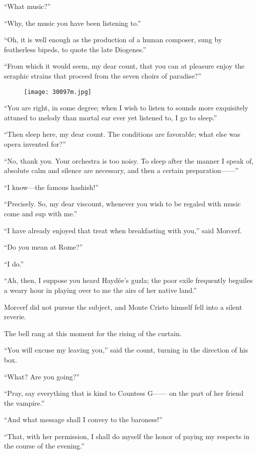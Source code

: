 “What music?”

“Why, the music you have been listening to.”

“Oh, it is well enough as the production of a human composer, sung by
featherless bipeds, to quote the late Diogenes.”

“From which it would seem, my dear count, that you can at pleasure
enjoy the seraphic strains that proceed from the seven choirs of
paradise?”

\begin{figure}[ht]
\texttt{[image: 30097m.jpg]}
\end{figure}

“You are right, in some degree; when I wish to listen to sounds more
exquisitely attuned to melody than mortal ear ever yet listened to, I
go to sleep.”

“Then sleep here, my dear count. The conditions are favorable; what
else was opera invented for?”

“No, thank you. Your orchestra is too noisy. To sleep after the manner
I speak of, absolute calm and silence are necessary, and then a certain
preparation——”

“I know—the famous hashish!”

“Precisely. So, my dear viscount, whenever you wish to be regaled with
music come and sup with me.”

“I have already enjoyed that treat when breakfasting with you,” said
Morcerf.

“Do you mean at Rome?”

“I do.”

“Ah, then, I suppose you heard Haydée’s guzla; the poor exile
frequently beguiles a weary hour in playing over to me the airs of her
native land.”

Morcerf did not pursue the subject, and Monte Cristo himself fell into
a silent reverie.

The bell rang at this moment for the rising of the curtain.

“You will excuse my leaving you,” said the count, turning in the
direction of his box.

“What? Are you going?”

“Pray, say everything that is kind to Countess G—— on the part of her
friend the vampire.”

“And what message shall I convey to the baroness!”

“That, with her permission, I shall do myself the honor of paying my
respects in the course of the evening.”

